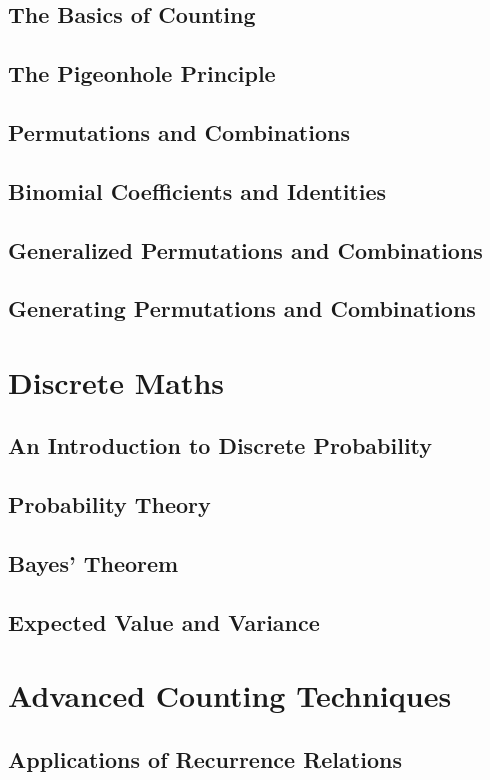 \documentclass{article}
\begin{document}
\subsection{The Basics of Counting}
\subsection{The Pigeonhole Principle}
\subsection{Permutations and Combinations}
\subsection{Binomial Coefficients and Identities}
\subsection{Generalized Permutations and Combinations}
\subsection{Generating Permutations and Combinations}

\section{Discrete Maths}

\subsection{An Introduction to Discrete Probability}
\subsection{Probability Theory}
\subsection{Bayes’ Theorem}
\subsection{Expected Value and Variance}

\section{Advanced Counting Techniques}

\subsection{Applications of Recurrence Relations}
\end{document}
